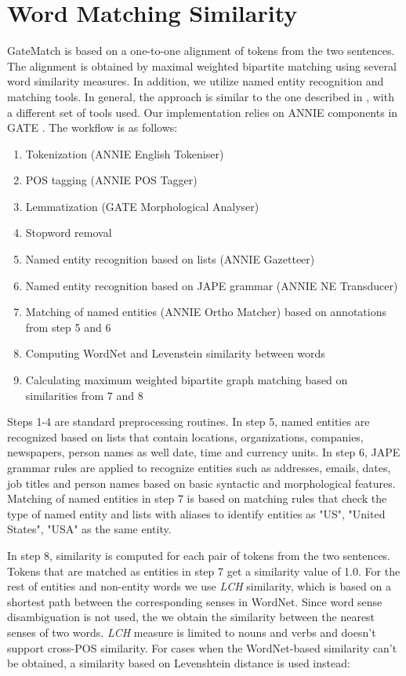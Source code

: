 \section{Word Matching Similarity}
GateMatch is based on a one-to-one alignment of tokens from the two sentences. The alignment is obtained by maximal weighted bipartite matching using several word similarity measures. In addition, we utilize named entity recognition and matching tools. In general, the approach is similar to the one described in \cite{Karnick2012}, with a different set of tools used. Our implementation relies on ANNIE components in GATE \cite{Cunningham}. The workflow is as follows:

\begin{enumerate}
\item
Tokenization (ANNIE English Tokeniser)
\item
POS tagging (ANNIE POS Tagger)
\item
Lemmatization (GATE Morphological Analyser)
\item
Stopword removal
\item
Named entity recognition based on lists (ANNIE Gazetteer)
\item
Named entity recognition based on JAPE grammar (ANNIE NE Transducer)
\item
Matching of named entities (ANNIE Ortho Matcher) based on annotations from step 5 and 6
\item
Computing WordNet and Levenstein similarity between words
\item
Calculating maximum weighted bipartite graph matching based on similarities from 7 and 8
\end{enumerate}

Steps 1-4 are standard preprocessing routines. In step 5, named entities are recognized based on lists that contain locations, organizations, companies, newspapers, person names as well date, time and currency units. In step 6, JAPE grammar rules are applied to recognize entities such as addresses, emails, dates, job titles and person names  based on basic syntactic and morphological features. Matching of named entities in step 7 is based on matching rules that check the type of named entity and lists with aliases to identify entities as "US", "United States", "USA" as the same entity. 

In step 8, similarity is computed for each pair of tokens from the two sentences. Tokens that are matched as entities in step 7 get a similarity value of 1.0. For the rest of entities and non-entity words we use \emph{LCH} \cite{Leacock1998} similarity, which is based on a shortest path between the corresponding senses in WordNet. Since word sense disambiguation is not used, the we obtain the similarity between the nearest senses of two words. \emph{LCH} measure is limited to nouns and verbs and doesn't support cross-POS similarity. For cases when the WordNet-based similarity can't be obtained, a similarity based on Levenshtein distance \cite{Levenshtein1966} is used instead:

